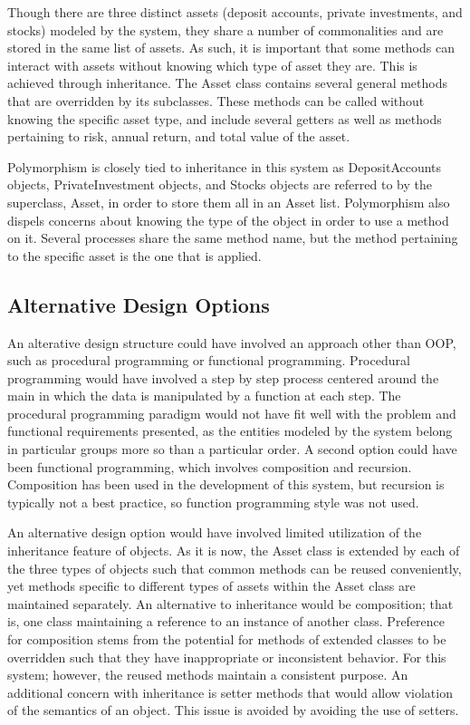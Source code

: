 \documentclass[12pt]{scrartcl} %
\begin{document}
    Though there are three distinct assets (deposit accounts, private investments, and stocks) modeled by the system, they share a number of commonalities and are stored in the same list of assets.  As such, it is important that some methods can interact with assets without knowing which type of asset they are.  This is achieved through inheritance.  The Asset class contains several general methods that are overridden by its subclasses.  These methods can be called without knowing the specific asset type, and include several getters as well as methods pertaining to risk, annual return, and total value of the asset.

    Polymorphism is closely tied to inheritance in this system as DepositAccounts objects, PrivateInvestment objects, and Stocks objects are referred to by the superclass, Asset, in order to store them all in an Asset list.  Polymorphism also dispels concerns about knowing the type of the object in order to use a method on it.  Several processes share the same method name, but the method pertaining to the specific asset is the one that is applied.

    \subsection{Alternative Design Options}

    An alterative design structure could have involved an approach other than OOP, such as procedural programming or functional programming.  Procedural programming would have involved a step by step process centered around the main in which the data is manipulated by a function at each step.  The procedural programming paradigm would not have fit well with the problem and functional requirements presented, as the entities modeled by the system belong in particular groups more so than a particular order.  A second option could have been functional programming, which involves composition and recursion.  Composition has been used in the development of this system, but recursion is typically not a best practice, so function programming style was not used.

    An alternative design option would have involved limited utilization of the inheritance feature of objects.  As it is now, the Asset class is extended by each of the three types of objects such that common methods can be reused conveniently, yet methods specific to different types of assets within the Asset class are maintained separately.  An alternative to inheritance would be composition; that is, one class maintaining a reference to an instance of another class.  Preference for composition stems from the potential for methods of extended classes to be overridden such that they have inappropriate or inconsistent behavior.  For this system; however, the reused methods maintain a consistent purpose.  An additional concern with inheritance is setter methods that would allow violation of the semantics of an object.  This issue is avoided by avoiding the use of setters.
\end{document}
